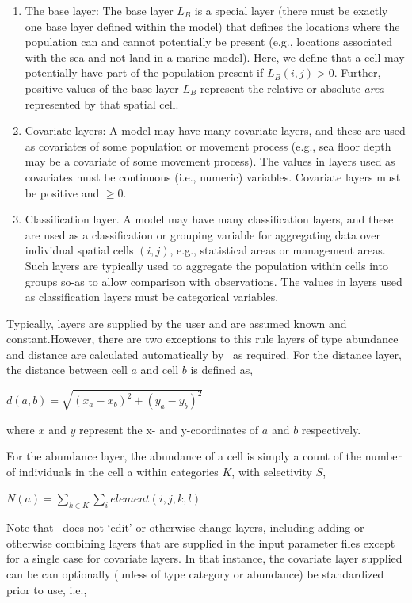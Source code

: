 \begin{enumerate}

\item The base layer: The base layer $L_B$ is a special layer (there must be exactly one base layer defined within the model) that defines the locations where the population can and cannot potentially be present (e.g., locations associated with the sea and not land in a marine model). Here, we define that a cell may potentially have part of the population present if $L_B(i,j) > 0$. Further, positive values of the base layer $L_B$ represent the relative or absolute \emph{area} represented by that spatial cell. 

\item Covariate layers: A model may have many covariate layers, and these are used as covariates of some population or movement process (e.g., sea floor depth may be a covariate of some movement process). The values in layers used as covariates must be continuous (i.e., numeric) variables. Covariate layers must be positive and $\geq 0$.

\item Classification layer. A model may have many classification layers, and these are used as a classification or grouping variable for aggregating data over individual spatial cells $(i,j)$, e.g., statistical areas or management areas. Such layers are typically used to aggregate the population within cells into groups so-as to allow comparison with observations. The values in layers used as classification layers must be categorical variables.

\end{enumerate}

Typically, layers are supplied by the user and are assumed known and constant.However, there are two exceptions to this rule \textemdash layers of type abundance and distance are calculated automatically by \SPM\ as required. For the distance layer, the distance between cell $a$ and cell $b$ is defined as,

$d(a,b)=\sqrt{(x_a-x_b)^2 +(y_a-y_b)^2}$

where $x$ and $y$ represent the x- and y-coordinates of $a$ and $b$ respectively.

For the abundance layer, the abundance of a cell is simply a count of the number of individuals in the cell a within categories $K$, with selectivity $S$,

$N(a)=\sum_{k\in K} \sum_i element(i,j,k,l)$

Note that \SPM\ does not `edit' or otherwise change layers, including adding or otherwise combining layers that are supplied in the input parameter files \textemdash except for a single case for covariate layers. In that instance, the covariate layer supplied can be can optionally (unless of type category or abundance) be standardized prior to use, i.e.,

